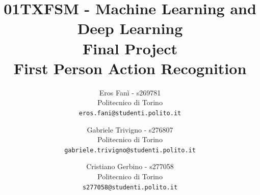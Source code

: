 \documentclass[10pt,twocolumn,hidelinks,letterpaper]{article}
\begin{document}
\title{01TXFSM - Machine Learning and Deep Learning \\
\vspace{0.3in}
Final Project \\
First Person Action Recognition}

\author{
  Eros Fanì - s269781\\
  Politecnico di Torino\\
  {\tt\small eros.fani@studenti.polito.it}
  \and
  Gabriele Trivigno - s276807\\
  Politecnico di Torino\\
  {\tt\small gabriele.trivigno@studenti.polito.it}
  \and
  Cristiano Gerbino - s277058\\
  Politecnico di Torino\\
  {\tt\small s277058@studenti.polito.it}
}

\maketitle


\newcommand{\quotes}[1]{“#1”}
\newcommand{\reff}[1]{Figure \ref{#1}}
\setlength{\parindent}{0pt}
\setlength{\parskip}{1em}

\begin{abstract}


\end{abstract}
\end{document}
